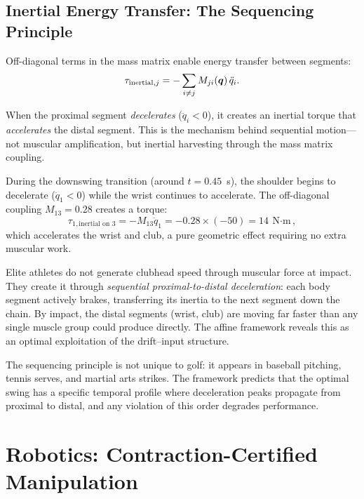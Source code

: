 \subsection{Inertial Energy Transfer: The Sequencing Principle}

Off-diagonal terms in the mass matrix enable energy transfer between segments:
\begin{equation}
\tau_{\text{inertial},j} = -\sum_{i\neq j} M_{ji}(\bm{q})\,\ddot{q}_i.
\label{eq:ch8:inertial-transfer}
\end{equation}

When the proximal segment \emph{decelerates} ($\ddot{q}_i < 0$), it creates an inertial
torque that \emph{accelerates} the distal segment. This is the mechanism behind
sequential motion---not muscular amplification, but inertial harvesting through the
mass matrix coupling.

During the downswing transition (around $t = 0.45$~s), the shoulder begins to decelerate
($\ddot{q}_1 < 0$) while the wrist continues to accelerate. The off-diagonal coupling
$M_{13} = 0.28$ creates a torque:
\begin{equation}
\tau_{1,\text{inertial on 3}} = -M_{13} \ddot{q}_1 = -0.28 \times (-50) = 14~\text{N$\cdot$m},
\end{equation}
which accelerates the wrist and club, a pure geometric effect requiring no extra muscular
work.

\begin{designbox}
Elite athletes do not generate clubhead speed through muscular force at impact. They
create it through \emph{sequential proximal-to-distal deceleration}: each body segment
actively brakes, transferring its inertia to the next segment down the chain. By impact,
the distal segments (wrist, club) are moving far faster than any single muscle group
could produce directly. The affine framework reveals this as an optimal exploitation of
the drift--input structure.

The sequencing principle is not unique to golf: it appears in baseball pitching, tennis
serves, and martial arts strikes. The framework predicts that the optimal swing has a
specific temporal profile where deceleration peaks propagate from proximal to distal,
and any violation of this order degrades performance.
\end{designbox}

\section{Robotics: Contraction-Certified Manipulation}

